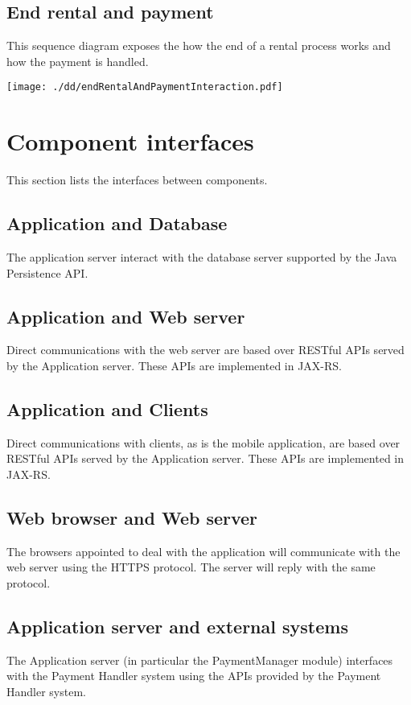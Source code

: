 \documentclass{scrreprt}
\begin{document}
\subsection{End rental and payment}
This sequence diagram exposes the how the end of a rental process works and how the payment is handled.
\begin{center}
		\texttt{[image: ./dd/endRentalAndPaymentInteraction.pdf]}
\end{center}

\section{Component interfaces}
This section lists the interfaces between components.

\subsection{Application and Database}
The application server interact with the database server supported by the Java Persistence API.

\subsection{Application and Web server}
Direct communications with the web server are based over RESTful APIs served by the Application server. These APIs are implemented in JAX-RS.

\subsection{Application and Clients}
Direct communications with clients, as is the mobile application, are based over RESTful APIs served by the Application server. These APIs are implemented in JAX-RS.

\subsection{Web browser and Web server}
The browsers appointed to deal with the application will communicate with the web server using the HTTPS protocol. The server will reply with the same protocol.

\subsection{Application server and external systems}
The Application server (in particular the PaymentManager module) interfaces with the Payment Handler system using the APIs provided by the Payment Handler system.
\end{document}

